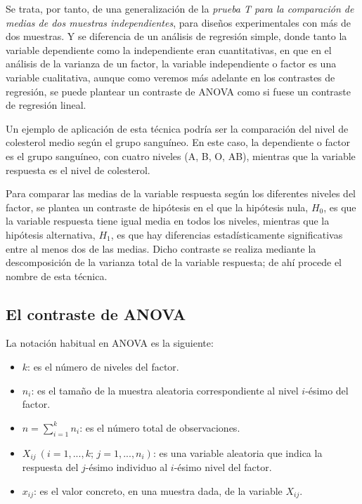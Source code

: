 \documentclass[
  spanish,
  a4paper,
]{scrreport}
\providecommand{\tightlist}{%
  \setlength{\itemsep}{0pt}\setlength{\parskip}{0pt}}
\theoremstyle{plain}
\theoremstyle{definition}
\theoremstyle{definition}
\theoremstyle{remark}
\begin{document}
Se trata, por tanto, de una generalización de la \emph{prueba T para la
comparación de medias de dos muestras independientes}, para diseños
experimentales con más de dos muestras. Y se diferencia de un análisis
de regresión simple, donde tanto la variable dependiente como la
independiente eran cuantitativas, en que en el análisis de la varianza
de un factor, la variable independiente o factor es una variable
cualitativa, aunque como veremos más adelante en los contrastes de
regresión, se puede plantear un contraste de ANOVA como si fuese un
contraste de regresión lineal.

Un ejemplo de aplicación de esta técnica podría ser la comparación del
nivel de colesterol medio según el grupo sanguíneo. En este caso, la
dependiente o factor es el grupo sanguíneo, con cuatro niveles (A, B, O,
AB), mientras que la variable respuesta es el nivel de colesterol.

Para comparar las medias de la variable respuesta según los diferentes
niveles del factor, se plantea un contraste de hipótesis en el que la
hipótesis nula, \(H_0\), es que la variable respuesta tiene igual media
en todos los niveles, mientras que la hipótesis alternativa, \(H_1\), es
que hay diferencias estadísticamente significativas entre al menos dos
de las medias. Dicho contraste se realiza mediante la descomposición de
la varianza total de la variable respuesta; de ahí procede el nombre de
esta técnica.

\subsection{El contraste de ANOVA}\label{el-contraste-de-anova}

La notación habitual en ANOVA es la siguiente:

\begin{itemize}
\tightlist
\item
  \(k\): es el número de niveles del factor.
\item
  \(n_i\): es el tamaño de la muestra aleatoria correspondiente al nivel
  \(i\)-ésimo del factor.
\item
  \(n = \sum_{i = 1}^k {n_i}\): es el número total de observaciones.
\item
  \(X_{ij}\ (i = 1,...,k;\,j = 1,...,n_i)\): es una variable aleatoria
  que indica la respuesta del \(j\)-ésimo individuo al \(i\)-ésimo nivel
  del factor.
\item
  \(x_{ij}\): es el valor concreto, en una muestra dada, de la variable
  \(X_{ij}\).
\end{itemize}
\end{document}
